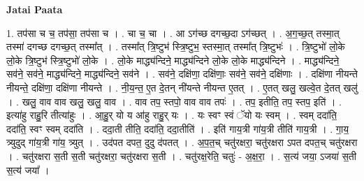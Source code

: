 \documentclass[17pt]{extarticle}
\begin{document}
\textbf{Jatai Paata} \newline

1. तप॑सा च च॒ तप॑सा॒ तप॑सा च । . चा च॒ चा । . आ ऽग॑च्छ दगच्छ॒दा ऽग॑च्छत् । . अ॒ग॒च्छ॒त् तस्मा॒त् तस्मा॑ दगच्छ दगच्छ॒त् तस्मा᳚त् । . तस्मा᳚त् त्रि॒ष्टुभ॑ स्त्रि॒ष्टुभ॒ स्तस्मा॒त् तस्मा᳚त् त्रि॒ष्टुभः॑ । . त्रि॒ष्टुभो॑ लो॒के लो॒के त्रि॒ष्टुभ॑ स्त्रि॒ष्टुभो॑ लो॒के । . लो॒के माद्ध्य॑न्दिने॒ माद्ध्य॑न्दिने लो॒के लो॒के माद्ध्य॑न्दिने । . माद्ध्य॑न्दिने॒ सव॑ने॒ सव॑ने॒ माद्ध्य॑न्दिने॒ माद्ध्य॑न्दिने॒ सव॑ने । . सव॑ने॒ दक्षि॑णा॒ दक्षि॑णाः॒ सव॑ने॒ सव॑ने॒ दक्षि॑णाः । . दक्षि॑णा नीयन्ते नीयन्ते॒ दक्षि॑णा॒ दक्षि॑णा नीयन्ते । . नी॒य॒न्त॒ ए॒त दे॒तन् नी॑यन्ते नीयन्त ए॒तत् । . ए॒तत् खलु॒ खल्वे॒त दे॒तत् खलु॑ । . खलु॒ वाव वाव खलु॒ खलु॒ वाव । . वाव तप॒ स्तपो॒ वाव वाव तपः॑ । . तप॒ इतीति॒ तप॒ स्तप॒ इति॑ । . इत्या॑हु राहु॒रि तीत्या॑हुः । . आ॒हु॒र् यो य आ॑हु राहु॒र् यः । . यः स्वꣳ स्वं ॅयो यः स्वम् । . स्वम् ददा॑ति॒ ददा॑ति॒ स्वꣳ स्वम् ददा॑ति । . ददा॒ती तीति॒ ददा॑ति॒ ददा॒तीति॑ । . इति॑ गाय॒त्री गा॑य॒त्री तीति॑ गाय॒त्री । . गा॒य॒ त्र्युदुद् गा॑य॒त्री गा॑य॒ त्र्युत् । . उद॑पत दपत॒ दुदु द॑पतत् । . अ॒प॒त॒च् चतु॑रक्षरा॒ चतु॑रक्षरा ऽपत दपत॒च् चतु॑रक्षरा । . चतु॑रक्षरा स॒ती स॒ती चतु॑रक्षरा॒ चतु॑रक्षरा स॒ती । . चतु॑रक्ष॒रेति॒ चतुः॑ - अ॒क्ष॒रा॒ । . स॒त्य॑ जया॒ ऽजया॑ स॒ती स॒त्य॑ जया᳚ । \newline
\end{document}
